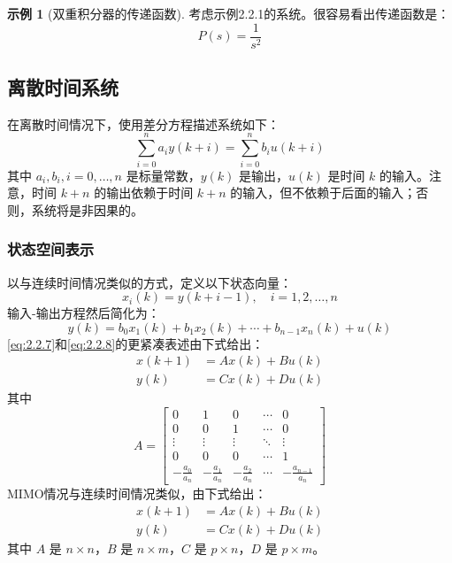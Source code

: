 \documentclass[UTF8,12pt,a4paper]{ctexart}
\theoremstyle{definition}
\newtheorem{example}{示例}[section]
\begin{document}
\begin{example}[双重积分器的传递函数]
考虑示例2.2.1的系统。很容易看出传递函数是：
\[
P(s) = \frac{1}{s^2}
\]
\end{example}

\subsection{离散时间系统}

在离散时间情况下，使用差分方程描述系统如下：
\begin{equation}\label{eq:2.2.12}
\sum_{i=0}^{n} a_i y(k+i) = \sum_{i=0}^{n} b_i u(k+i)
\end{equation}
其中 $a_i, b_i, i=0,\ldots,n$ 是标量常数，$y(k)$ 是输出，$u(k)$ 是时间 $k$ 的输入。注意，时间 $k+n$ 的输出依赖于时间 $k+n$ 的输入，但不依赖于后面的输入；否则，系统将是非因果的。

\subsubsection{状态空间表示}

以与连续时间情况类似的方式，定义以下状态向量：
\begin{equation}\label{eq:2.2.13}
x_i(k) = y(k+i-1), \quad i=1,2,\ldots,n
\end{equation}
输入-输出方程然后简化为：
\begin{equation}\label{eq:2.2.14}
y(k) = b_0 x_1(k) + b_1 x_2(k) + \cdots + b_{n-1}x_n(k) + u(k)
\end{equation}
\eqref{eq:2.2.7}和\eqref{eq:2.2.8}的更紧凑表述由下式给出：
\begin{equation}\label{eq:2.2.15}
\begin{aligned}
x(k+1) &= Ax(k) + Bu(k) \\
y(k) &= Cx(k) + Du(k)
\end{aligned}
\end{equation}
其中
\begin{equation}\label{eq:2.2.16}
A = \begin{bmatrix}
0 & 1 & 0 & \cdots & 0 \\
0 & 0 & 1 & \cdots & 0 \\
\vdots & \vdots & \vdots & \ddots & \vdots \\
0 & 0 & 0 & \cdots & 1 \\
-\frac{a_0}{a_n} & -\frac{a_1}{a_n} & -\frac{a_2}{a_n} & \cdots & -\frac{a_{n-1}}{a_n}
\end{bmatrix}
\end{equation}
MIMO情况与连续时间情况类似，由下式给出：
\begin{equation}\label{eq:2.2.17}
\begin{aligned}
x(k+1) &= Ax(k) + Bu(k) \\
y(k) &= Cx(k) + Du(k)
\end{aligned}
\end{equation}
其中 $A$ 是 $n \times n$，$B$ 是 $n \times m$，$C$ 是 $p \times n$，$D$ 是 $p \times m$。
\end{document}
